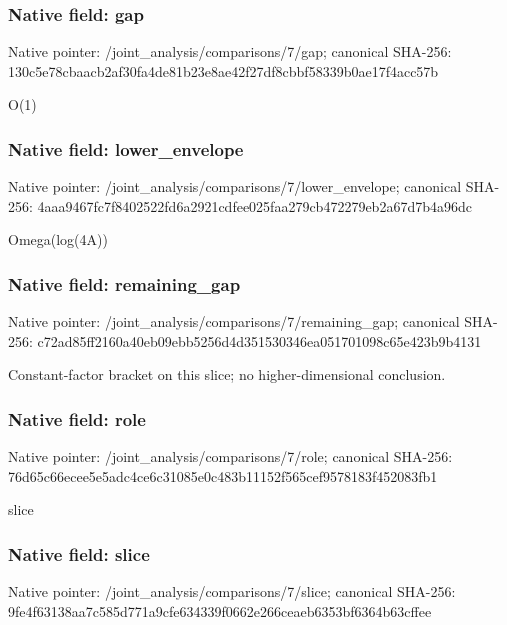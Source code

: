 \documentclass[10pt,a4paper]{article}
\begin{document}
\subsubsection{Native field: gap}
Native pointer: /joint\_\allowbreak{}analysis/comparisons/7/gap; canonical SHA-256: 130c5e78cbaacb2af30fa4de81b23e8ae42f27df8cbbf58339b0ae17f4acc57b

\begingroup\raggedright\sloppy O(1)\par\endgroup

\subsubsection{Native field: lower\_\allowbreak{}envelope}
Native pointer: /joint\_\allowbreak{}analysis/comparisons/7/lower\_\allowbreak{}envelope; canonical SHA-256: 4aaa9467fc7f8402522fd6a2921cdfee025faa279cb472279eb2a67d7b4a96dc

\begingroup\raggedright\sloppy Omega(log(4A))\par\endgroup

\subsubsection{Native field: remaining\_\allowbreak{}gap}
Native pointer: /joint\_\allowbreak{}analysis/comparisons/7/remaining\_\allowbreak{}gap; canonical SHA-256: c72ad85ff2160a40eb09ebb5256d4d351530346ea051701098c65e423b9b4131

\begingroup\raggedright\sloppy Constant-factor bracket on this slice;\allowbreak{} no higher-dimensional conclusion.\par\endgroup

\subsubsection{Native field: role}
Native pointer: /joint\_\allowbreak{}analysis/comparisons/7/role; canonical SHA-256: 76d65c66ecee5e5adc4ce6c31085e0c483b11152f565cef9578183f452083fb1

\begingroup\raggedright\sloppy slice\par\endgroup

\subsubsection{Native field: slice}
Native pointer: /joint\_\allowbreak{}analysis/comparisons/7/slice; canonical SHA-256: 9fe4f63138aa7c585d771a9cfe634339f0662e266ceaeb6353bf6364b63cffee
\end{document}
